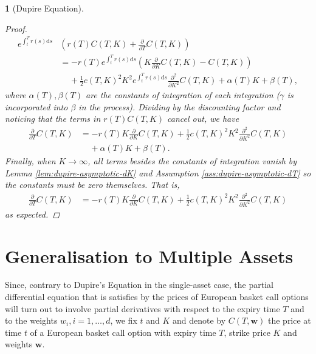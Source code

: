 \documentclass[english]{article}
\numberwithin{equation}{section}
\numberwithin{figure}{section}
\theoremstyle{bolddescit}
\newtheorem{theorem}{\protect\theoremname}[section]
\theoremstyle{definition}
\theoremstyle{definition}
\theoremstyle{plain}
\theoremstyle{plain}
\theoremstyle{bolddesc}
\theoremstyle{plain}
\theoremstyle{remark}
\providecommand{\theoremname}{Theorem}
\begin{document}
\begin{theorem}[Dupire Equation]
\begin{proof}
    \begin{align*}
      e^{\int_t^T r(s) \mathrm{d}s} &\left(r(T) C(T,K) + \frac{\partial}{\partial T}C(T,K)\right)\\
      &= - r(T) e^{\int_t^T r(s) \mathrm{d}s} \left( K \frac{\partial}{\partial K} C(T,K) - C(T,K) \right)\\
        &\ \ \ \ \ + \frac{1}{2} c(T,K)^2 K^2 e^{\int_t^T r(s) \mathrm{d}s}\frac{\partial^2}{\partial K^2} C(T,K) + \alpha(T) K + \beta(T),
    \end{align*}
    where $\alpha(T), \beta(T)$ are the constants of integration of each integration ($\gamma$ is incorporated into $\beta$ in the process). Dividing by the discounting factor and noticing that the terms in $r(T)C(T,K)$ cancel out, we have
    \begin{align*}
      \frac{\partial}{\partial T}C(T,K)
      &= - r(T) K \frac{\partial}{\partial K} C(T,K)
        + \frac{1}{2} c(T,K)^2 K^2 \frac{\partial^2}{\partial K^2} C(T,K)\\
        &\ \ \ \ \ + \alpha(T) K + \beta(T).
    \end{align*}
    Finally, when $K \to \infty$, all terms besides the constants of integration vanish by Lemma \ref{lem:dupire-asymptotic-dK} and Assumption \ref{ass:dupire-asymptotic-dT} so the constants must be zero themselves. That is,
    \begin{align*}
      \frac{\partial}{\partial T}C(T,K)
      &= - r(T) K \frac{\partial}{\partial K} C(T,K)
        + \frac{1}{2} c(T,K)^2 K^2 \frac{\partial^2}{\partial K^2} C(T,K)
    \end{align*}
    as expected.
  \end{proof}
\end{theorem}

\section{Generalisation to Multiple Assets}



Since, contrary to Dupire's Equation in the single-asset case, the partial differential equation that is satisfies by the prices of European basket call options will turn out to involve partial derivatives with respect to the expiry time $T$ and to the weights $w_i, i=1,\ldots,d$, we fix $t$ and $K$ and denote by $C(T,\mathbf{w})$ the price at time $t$ of a European basket call option with expiry time $T$, strike price $K$ and weights $\mathbf{w}$.
\end{document}
